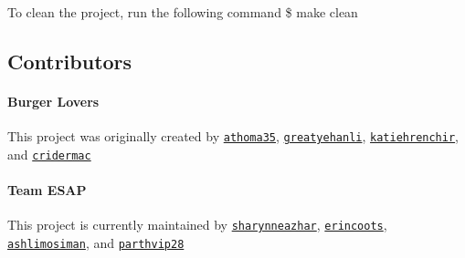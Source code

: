 To clean the project, run the following command {\ttfamily \$ make clean}

\subsection*{Contributors}

\paragraph*{Burger Lovers}

This project was originally created by \href{https://github.com/athoma35}{\tt athoma35}, \href{https://github.com/greatyehanli}{\tt greatyehanli}, \href{https://github.com/katiehrenchir}{\tt katiehrenchir}, and \href{https://github.com/cridermac}{\tt cridermac}

\paragraph*{Team E\+S\+AP}

This project is currently maintained by \href{https://github.com/sharynneazhar}{\tt sharynneazhar}, \href{https://github.com/erincoots}{\tt erincoots}, \href{https://github.com/ashlimosiman}{\tt ashlimosiman}, and \href{https://github.com/parthvip28}{\tt parthvip28} 